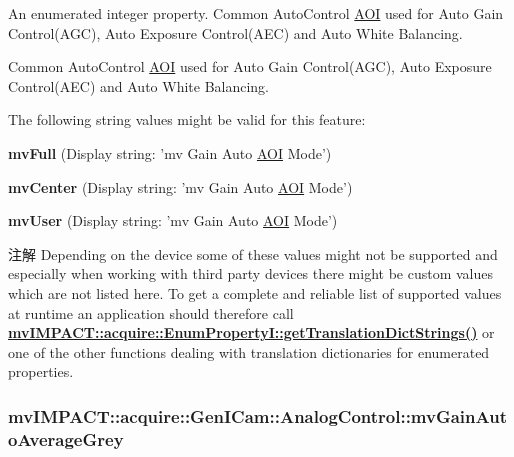 An enumerated integer property. Common Auto\+Control \hyperlink{struct_a_o_i}{A\+O\+I} used for Auto Gain Control(\+A\+G\+C), Auto Exposure Control(\+A\+E\+C) and Auto White Balancing. 

Common Auto\+Control \hyperlink{struct_a_o_i}{A\+O\+I} used for Auto Gain Control(\+A\+G\+C), Auto Exposure Control(\+A\+E\+C) and Auto White Balancing.

The following string values might be valid for this feature\+:
\begin{DoxyItemize}
\item {\bfseries mv\+Full} (Display string\+: 'mv Gain Auto \hyperlink{struct_a_o_i}{A\+O\+I} Mode')
\item {\bfseries mv\+Center} (Display string\+: 'mv Gain Auto \hyperlink{struct_a_o_i}{A\+O\+I} Mode')
\item {\bfseries mv\+User} (Display string\+: 'mv Gain Auto \hyperlink{struct_a_o_i}{A\+O\+I} Mode')
\end{DoxyItemize}

\begin{DoxyNote}{注解}
Depending on the device some of these values might not be supported and especially when working with third party devices there might be custom values which are not listed here. To get a complete and reliable list of supported values at runtime an application should therefore call {\bfseries \hyperlink{classmv_i_m_p_a_c_t_1_1acquire_1_1_enum_property_i_a0ba6ccbf5ee69784d5d0b537924d26b6}{mv\+I\+M\+P\+A\+C\+T\+::acquire\+::\+Enum\+Property\+I\+::get\+Translation\+Dict\+Strings()}} or one of the other functions dealing with translation dictionaries for enumerated properties. 
\end{DoxyNote}
\hypertarget{classmv_i_m_p_a_c_t_1_1acquire_1_1_gen_i_cam_1_1_analog_control_adf7a7e9ec02c79afa826b8003e473adf}{
\subsubsection[{mv\+Gain\+Auto\+Average\+Grey}]{ mv\+I\+M\+P\+A\+C\+T\+::acquire\+::\+Gen\+I\+Cam\+::\+Analog\+Control\+::mv\+Gain\+Auto\+Average\+Grey}}\label{classmv_i_m_p_a_c_t_1_1acquire_1_1_gen_i_cam_1_1_analog_control_adf7a7e9ec02c79afa826b8003e473adf}


